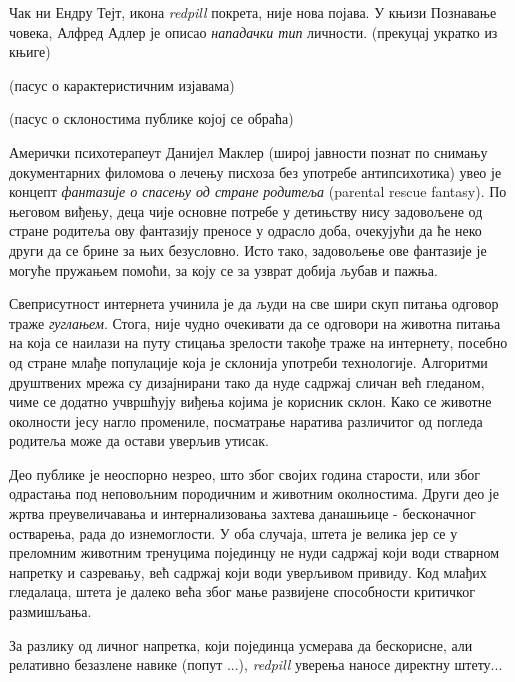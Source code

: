 \documentclass[b5paper]{article}
\begin{document}
Чак ни Ендру Тејт, икона \textit{redpill} покрета, није нова појава. У књизи Познавање човека, Алфред Адлер је описао \textit{нападачки тип} личности. (прекуцај укратко из књиге)

(пасус о карактеристичним изјавама)

(пасус о склоностима публике којој се обраћа)

Амерички психотерапеут Данијел Маклер (широј јавности познат по снимању документарних филомова о лечењу писхоза без употребе антипсихотика) увео је концепт \textit{фантазије о спасењу од стране родитеља} (parental rescue fantasy). По његовом виђењу, деца чије основне потребе у детињству нису задовољене од стране родитеља ову фантазију преносе у одрасло доба, очекујући да ће неко други да се брине за њих безусловно. Исто тако, задовољење ове фантазије је могуће пружањем помоћи, за коју се за узврат добија љубав и пажња.

Свеприсутност интернета учинила је да људи на све шири скуп питања одговор траже \textit{гуглањем}. Стога, није чудно очекивати да се одговори на животна питања на која се наилази на путу стицања зрелости такође траже на интернету, посебно од стране млађе популације која је склонија употреби технологије. Алгоритми друштвених мрежа су дизајнирани тако да нуде садржај сличан већ гледаном, чиме се додатно учвршћују виђења којима је корисник склон. Како се животне околности јесу нагло промениле, посматрање наратива различитог од погледа родитеља може да остави уверљив утисак.

Део публике је неоспорно незрео, што због својих година старости, или због одрастања под неповољним породичним и животним околностима. Други део је жртва преувеличавања и интернализовања захтева данашњице - бесконачног остварења, рада до изнемоглости. У оба случаја, штета је велика јер се у преломним животним тренуцима појединцу не нуди садржај који води стварном напретку и сазревању, већ садржај који води уверљивом привиду. Код млађих гледалаца, штета је далеко већа због мање развијене способности критичког размишљања.

За разлику од личног напретка, који појединца усмерава да бескорисне, али релативно безазлене навике (попут ...), \textit{redpill} уверења наносе директну штету...
\end{document}
